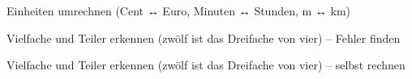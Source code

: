 \begin{aufgabe}{Einheiten umrechnen (Cent ↔ Euro, Minuten ↔ Stunden, m ↔ km)}
\end{aufgabe}

\begin{aufgabe}{Vielfache und Teiler erkennen (zwölf ist das Dreifache von vier) – Fehler finden}
\end{aufgabe}

\begin{aufgabe}{Vielfache und Teiler erkennen (zwölf ist das Dreifache von vier) – selbst rechnen}
\end{aufgabe}
